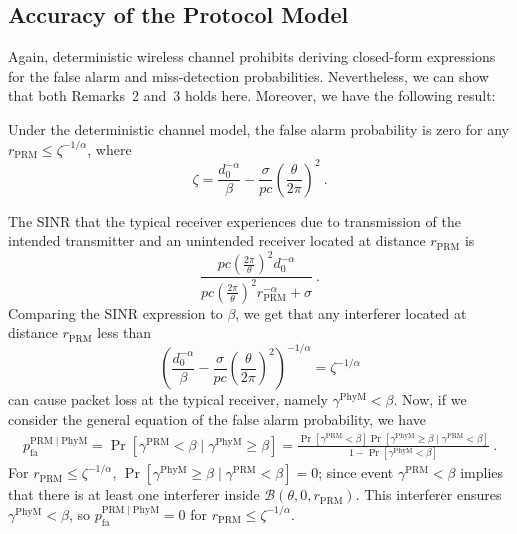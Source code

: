 \documentclass[12pt, draftclsnofoot, onecolumn]{IEEEtran}
\begin{document}
\subsection{Accuracy of the Protocol Model}\label{subsec: example-3-PRM}
Again, deterministic wireless channel prohibits deriving closed-form expressions for the false alarm and miss-detection probabilities. Nevertheless, we can show that both Remarks~2 and~3 holds here. Moreover, we have the following result:
\begin{result}\label{result: 7}
Under the deterministic channel model, the false alarm probability is zero for any $r_{\mathrm{PRM}} \leq \zeta^{-1/\alpha}$, where
\begin{equation}\label{eq: zeta}
\zeta =   \frac{d_{0}^{-\alpha}}{\beta} - \frac{\sigma}{pc}\left( \frac{\theta }{2 \pi} \right)^{2} \:.
\end{equation}
\end{result}
\begin{IEEEproof}
The SINR that the typical receiver experiences due to transmission of the intended transmitter and an unintended receiver located at distance $r_{\mathrm{PRM}}$ is
\begin{equation*}
\frac{p c \left( \frac{2 \pi}{\theta} \right)^2 d_{0}^{-\alpha} }{p c \left( \frac{2 \pi}{\theta} \right)^2 r_{\mathrm{PRM}}^{-\alpha} +\sigma} \:.
\end{equation*}
Comparing the SINR expression to $\beta$, we get that any interferer located at distance $r_{\mathrm{PRM}}$ less than
\begin{equation*}
\left( \frac{d_{0}^{-\alpha}}{\beta} - \frac{\sigma}{pc}\left( \frac{\theta}{2 \pi} \right)^{2} \right)^{-1/\alpha}  = \zeta^{-1/\alpha}
\end{equation*}
can cause packet loss at the typical receiver, namely ${\gamma^{\mathrm{PhyM}} < \beta}$.
Now, if we consider the general equation of the false alarm probability, we have
\begin{align*}
p_{\mathrm{fa}}^{{\mathrm{PRM}} \mid {\mathrm{PhyM}}}  = \Pr \left[\gamma^{\mathrm{PRM}} < \beta \mid \gamma^{\mathrm{PhyM}} \geq \beta \right]  = \frac{\Pr \left[\gamma^{\mathrm{PRM}} < \beta \right] \Pr \left[\gamma^{\mathrm{PhyM}} \geq \beta \mid \gamma^{\mathrm{PRM}} < \beta \right]}{1 - \Pr \left[\gamma^{\mathrm{PhyM}} < \beta \right]} \:.
\end{align*}
For $r_{\mathrm{PRM}} \leq \zeta^{-1/\alpha}$, $\Pr \left[\gamma^{\mathrm{PhyM}} \geq \beta \mid \gamma^{\mathrm{PRM}} < \beta \right] = 0$; since event $\gamma^{\mathrm{PRM}} < \beta$ implies that there is at least one interferer inside $\mathcal{B}(\theta,0,r_{\mathrm{PRM}})$. This interferer ensures $\gamma^{\mathrm{PhyM}} < \beta$, so $p_{\mathrm{fa}}^{{\mathrm{PRM}} \mid {\mathrm{PhyM}}} = 0$ for $r_{\mathrm{PRM}} \leq \zeta^{-1/\alpha}$.
\end{IEEEproof}
\end{document}
